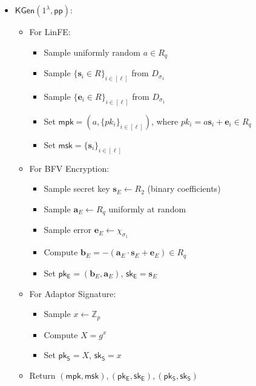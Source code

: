 \begin{itemize}
\item $\mathsf{KGen}(1^\lambda, \mathsf{pp})$:
   \begin{itemize}
       \item For LinFE:
           \begin{itemize}
               \item Sample uniformly random $a \in R_q$
               \item Sample $\{\mathbf{s}_i \in R\}_{i \in [\ell]}$ from $D_{\sigma_1}$
               \item Sample $\{\mathbf{e}_i \in R\}_{i \in [\ell]}$ from $D_{\sigma_1}$
               \item Set $\mathsf{mpk} = (a, \{pk_i\}_{i \in [\ell]})$, where $pk_i = a\mathbf{s}_i + \mathbf{e}_i \in R_q$
               \item Set $\mathsf{msk} = \{\mathbf{s}_i\}_{i \in [\ell]}$
           \end{itemize}
       \item For BFV Encryption:
           \begin{itemize}
               \item Sample secret key $\mathbf{s}_E \leftarrow R_2$ (binary coefficients)
               \item Sample $\mathbf{a}_E \leftarrow R_q$ uniformly at random
               \item Sample error $\mathbf{e}_E \leftarrow \chi_{\sigma_1}$
               \item Compute $\mathbf{b}_E = -(\mathbf{a}_E \cdot \mathbf{s}_E + \mathbf{e}_E) \in R_q$
               \item Set $\mathsf{pk_E} = (\mathbf{b}_E, \mathbf{a}_E)$, $\mathsf{sk_E} = \mathbf{s}_E$
           \end{itemize}
       \item For Adaptor Signature:
           \begin{itemize}
               \item Sample $x \leftarrow \mathbb{Z}_p$
               \item Compute $X = g^x$
               \item Set $\mathsf{pk_S} = X$, $\mathsf{sk_S} = x$
           \end{itemize}
       \item Return $(\mathsf{mpk}, \mathsf{msk}), (\mathsf{pk_E}, \mathsf{sk_E}), (\mathsf{pk_S}, \mathsf{sk_S})$
   \end{itemize}


\end{itemize}
